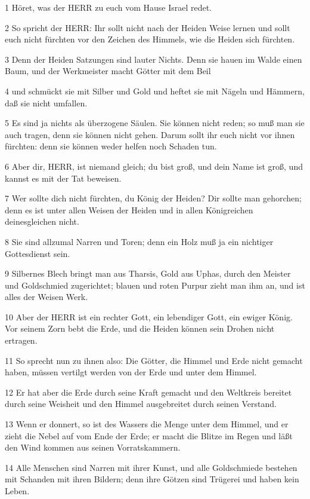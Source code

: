\par 1 Höret, was der HERR zu euch vom Hause Israel redet.
\par 2 So spricht der HERR: Ihr sollt nicht nach der Heiden Weise lernen und sollt euch nicht fürchten vor den Zeichen des Himmels, wie die Heiden sich fürchten.
\par 3 Denn der Heiden Satzungen sind lauter Nichts. Denn sie hauen im Walde einen Baum, und der Werkmeister macht Götter mit dem Beil
\par 4 und schmückt sie mit Silber und Gold und heftet sie mit Nägeln und Hämmern, daß sie nicht umfallen.
\par 5 Es sind ja nichts als überzogene Säulen. Sie können nicht reden; so muß man sie auch tragen, denn sie können nicht gehen. Darum sollt ihr euch nicht vor ihnen fürchten: denn sie können weder helfen noch Schaden tun.
\par 6 Aber dir, HERR, ist niemand gleich; du bist groß, und dein Name ist groß, und kannst es mit der Tat beweisen.
\par 7 Wer sollte dich nicht fürchten, du König der Heiden? Dir sollte man gehorchen; denn es ist unter allen Weisen der Heiden und in allen Königreichen deinesgleichen nicht.
\par 8 Sie sind allzumal Narren und Toren; denn ein Holz muß ja ein nichtiger Gottesdienst sein.
\par 9 Silbernes Blech bringt man aus Tharsis, Gold aus Uphas, durch den Meister und Goldschmied zugerichtet; blauen und roten Purpur zieht man ihm an, und ist alles der Weisen Werk.
\par 10 Aber der HERR ist ein rechter Gott, ein lebendiger Gott, ein ewiger König. Vor seinem Zorn bebt die Erde, und die Heiden können sein Drohen nicht ertragen.
\par 11 So sprecht nun zu ihnen also: Die Götter, die Himmel und Erde nicht gemacht haben, müssen vertilgt werden von der Erde und unter dem Himmel.
\par 12 Er hat aber die Erde durch seine Kraft gemacht und den Weltkreis bereitet durch seine Weisheit und den Himmel ausgebreitet durch seinen Verstand.
\par 13 Wenn er donnert, so ist des Wassers die Menge unter dem Himmel, und er zieht die Nebel auf vom Ende der Erde; er macht die Blitze im Regen und läßt den Wind kommen aus seinen Vorratskammern.
\par 14 Alle Menschen sind Narren mit ihrer Kunst, und alle Goldschmiede bestehen mit Schanden mit ihren Bildern; denn ihre Götzen sind Trügerei und haben kein Leben.
